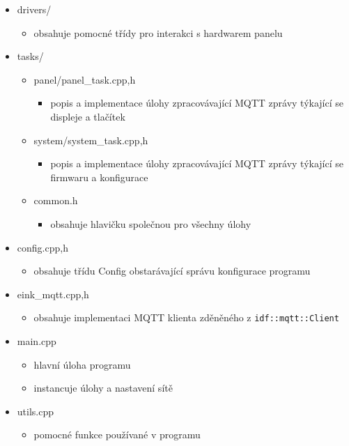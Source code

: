 \begin{itemize}
    \item drivers/
    \begin{itemize}
        \item obsahuje pomocné třídy pro interakci s hardwarem panelu
    \end{itemize}
    \item tasks/
    \begin{itemize}
        \item panel/panel\_task.{cpp,h}
        \begin{itemize}
            \item popis a implementace úlohy zpracovávající MQTT zprávy týkající se displeje a tlačítek
        \end{itemize}
        \item system/system\_task.{cpp,h}
        \begin{itemize}
            \item popis a implementace úlohy zpracovávající MQTT zprávy týkající se firmwaru a konfigurace
        \end{itemize}
        \item common.h
            \begin{itemize}
                \item obsahuje hlavičku společnou pro všechny úlohy
            \end{itemize}
    \end{itemize}
    \item config.{cpp,h}
    \begin{itemize}
        \item obsahuje třídu Config obstarávající správu konfigurace programu
    \end{itemize}
    \item eink\_mqtt.{cpp,h}
    \begin{itemize}
        \item obsahuje implementaci MQTT klienta zděněného z \lstinline|idf::mqtt::Client|
    \end{itemize}
    \item main.cpp
    \begin{itemize}
        \item hlavní úloha programu
        \item instancuje úlohy a nastavení sítě
    \end{itemize}
    \item utils.cpp
    \begin{itemize}
        \item pomocné funkce používané v programu
    \end{itemize}
\end{itemize}

